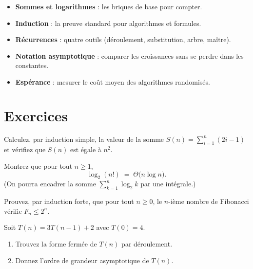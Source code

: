\begin{itemize}
  \item \textbf{Sommes et logarithmes }: les briques de base pour compter.
  \item \textbf{Induction }: la preuve standard pour algorithmes et formules.
  \item \textbf{Récurrences }: quatre outils (déroulement, substitution, arbre, maître).
  \item \textbf{Notation asymptotique }: comparer les croissances sans se perdre
        dans les constantes.
  \item \textbf{Espérance }: mesurer le coût moyen des algorithmes randomisés.
\end{itemize}

\section{Exercices}
\begin{exercice}
Calculez, par induction simple, la valeur de la somme
\(\displaystyle S(n)=\sum_{i=1}^{n}(2i-1)\)
et vérifiez que \(S(n)\) est égale à \(n^{2}\).
\end{exercice}

\begin{exercice}
Montrez que pour tout \(n\ge1\),
\[
\log_2(n!) \;=\; \Theta\!\bigl(n\log n\bigr).
\]
(On pourra encadrer la somme \(\sum_{k=1}^{n}\log_2 k\) par une intégrale.)
\end{exercice}

\begin{exercice}
Prouvez, par induction forte, que pour tout \(n\ge 0\),
le \(n\)-ième nombre de Fibonacci vérifie
\(F_{n}\le 2^{n}\).
\end{exercice}

\begin{exercice}
Soit \(T(n)=3T(n-1)+2\) avec \(T(0)=4\).
\begin{enumerate}[label=\alph*)]
  \item Trouvez la forme fermée de \(T(n)\) par déroulement.
  \item Donnez l’ordre de grandeur asymptotique de \(T(n)\).
\end{enumerate}
\end{exercice}


